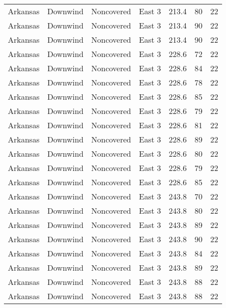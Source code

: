\documentclass{article}
\begin{document}
\begin{longtable}[H]{ccccccc}
Arkansas & Downwind  & Noncovered & East 3        & 213.4        & 80          & 22  \\
Arkansas & Downwind  & Noncovered & East 3        & 213.4        & 90          & 22  \\
Arkansas & Downwind  & Noncovered & East 3        & 213.4        & 90          & 22  \\
Arkansas & Downwind  & Noncovered & East 3        & 228.6        & 72          & 22  \\
Arkansas & Downwind  & Noncovered & East 3        & 228.6        & 84          & 22  \\
Arkansas & Downwind  & Noncovered & East 3        & 228.6        & 78          & 22  \\
Arkansas & Downwind  & Noncovered & East 3        & 228.6        & 85          & 22  \\
Arkansas & Downwind  & Noncovered & East 3        & 228.6        & 79          & 22  \\
Arkansas & Downwind  & Noncovered & East 3        & 228.6        & 81          & 22  \\
Arkansas & Downwind  & Noncovered & East 3        & 228.6        & 89          & 22  \\
Arkansas & Downwind  & Noncovered & East 3        & 228.6        & 80          & 22  \\
Arkansas & Downwind  & Noncovered & East 3        & 228.6        & 79          & 22  \\
Arkansas & Downwind  & Noncovered & East 3        & 228.6        & 85          & 22  \\
Arkansas & Downwind  & Noncovered & East 3        & 243.8        & 70          & 22  \\
Arkansas & Downwind  & Noncovered & East 3        & 243.8        & 80          & 22  \\
Arkansas & Downwind  & Noncovered & East 3        & 243.8        & 89          & 22  \\
Arkansas & Downwind  & Noncovered & East 3        & 243.8        & 90          & 22  \\
Arkansas & Downwind  & Noncovered & East 3        & 243.8        & 84          & 22  \\
Arkansas & Downwind  & Noncovered & East 3        & 243.8        & 89          & 22  \\
Arkansas & Downwind  & Noncovered & East 3        & 243.8        & 88          & 22  \\
Arkansas & Downwind  & Noncovered & East 3        & 243.8        & 88          & 22  \\

\end{longtable}
\end{document}
